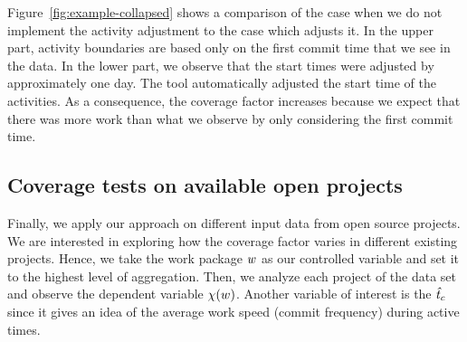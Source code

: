 Figure~\ref{fig:example-collapsed} shows a comparison of the case when we do not implement the activity adjustment to the case which adjusts it. In the upper part, activity boundaries are based only on the first commit time that we see in the data. In the lower part, we observe that the start times were adjusted by approximately one day. The tool automatically adjusted the start time of the activities. As a consequence, the coverage factor increases because we expect that there was more work than what we observe by only considering the first commit time.

\subsection{Coverage tests on available open projects}

Finally, we apply our approach on different input data from open source projects. We are interested in exploring how the coverage factor varies in different existing projects. Hence, we take the work package $w$ as our controlled variable and set it to the highest level of aggregation. Then, we analyze each project of the data set and observe the dependent variable $\chi(w)$.
Another variable of interest is the $\mathit{\hat{t}_{c}}$ since it gives an idea of the average work speed (commit frequency) during active times.


